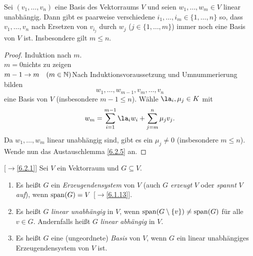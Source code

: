 \documentclass[../../main.tex]{subfiles}
\begin{document}
\begin{sat}\label{6.2.6}
Sei $(v_1,\dots,v_n)$ eine Basis des Vektorraums $V$ und seien $w_1,\dots,w_m\in V$ linear unabhängig. Dann gibt es paarweise verschiedene
$i_1,\dots,i_m\in\{1,\dots,n\}$ so, dass $v_1,\dots,v_n$ nach Ersetzen von $v_{i_j}$ durch $w_j$ {\rm($j\in\{1,\dots,m\}$)} immer noch eine Basis von $V$ ist. Insbesondere
gilt $m\le n$.
\end{sat}
\begin{proof}
Induktion nach $m$.\\
\underline{$m=0$}\quad nichts zu zeigen\\
\underline{$m-1\to m\quad(m\in\mathbb N)$}\quad Nach Induktionsvoraussetzung und Umnummerierung bilden $$w_1,\dots,w_{m-1},v_m,\dots,v_n$$ eine Basis von $V$
(insbesondere $m-1\le n$). Wähle
$\la_i,\mu_j\in K$ mit $$w_m=\sum_{i=1}^{m-1}\la_iw_i+\sum_{j=m}^n\mu_jv_j.$$ Da $w_1,\dots,w_m$ linear unabhängig sind, gibt es ein $\mu_j\ne0$
(insbesondere $m\le n$). Wende nun das Austauschlemma \ref{6.2.5} an.
\end{proof}

\begin{df}\mbox{}[$\to$\ref{6.2.1}] \label{6.2.7}
Sei $V$ ein Vektorraum und $G\subseteq V$.
\begin{enumerate}[\normalfont(a)]
\item Es heißt $G$ ein \emph{Erzeugendensystem} von $V$ (auch $G$ \emph{erzeugt} $V$ oder \emph{spannt} $V$ \emph{auf}), wenn $\operatorname{span}(G)=V$ [$\to$\ref{6.1.13}].
\item Es heißt $G$ \emph{linear unabhängig} in $V$, wenn $\operatorname{span}(G\setminus\{v\})\ne\operatorname{span}(G)$ für alle $v\in G$. Andernfalls heißt $G$ \emph{linear abhängig} in $V$.
\item Es heißt $G$ eine (ungeordnete) \emph{Basis} von $V$, wenn $G$ ein linear unabhängiges Erzeugendensystem von $V$ ist.
\end{enumerate}
\end{df}
\end{document}
